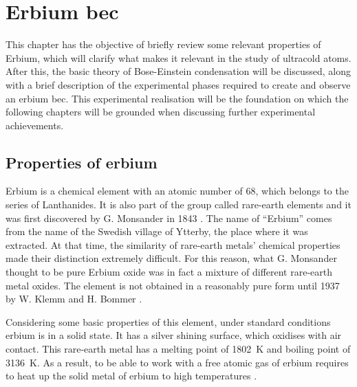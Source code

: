 
\chapter{Erbium \acl*{bec}}
\label{chap:erbium_bec}

This chapter has the objective of briefly review some relevant properties of Erbium, which will clarify what makes it relevant in the study of ultracold atoms. After this, the basic theory of Bose-Einstein condensation will be discussed, along with a brief description of the experimental phases required to create and observe an erbium \ac{bec}. This experimental realisation will be the foundation on which the following chapters will be grounded when discussing further experimental achievements.

\section{Properties of erbium} \label{sec:erbium_properties}
Erbium is a chemical element with an atomic number of 68, which belongs to the series of Lanthanides. It is also part of the group called rare-earth elements and it was first discovered by G. Monsander in 1843 \cite{mosander1843xxx}. The name of ``Erbium'' comes from the name of the Swedish village of Ytterby, the place where it was extracted. At that time, the similarity of rare-earth metals' chemical properties made their distinction extremely difficult. For this reason, what G. Monsander thought to be pure Erbium oxide was in fact a mixture of different rare-earth metal oxides. The element is not obtained in a reasonably pure form until 1937 by W. Klemm and H. Bommer \cite{klemm1937bommer}.

Considering some basic properties of this element, under standard conditions erbium is in a solid state. It has a silver shining surface, which oxidises with air contact. This rare-earth metal has a melting point of \SI{1802}{\kelvin} and boiling point of \SI{3136}{\kelvin}. As a result, to be able to work with a free atomic gas of erbium requires to heat up the solid metal of erbium to high temperatures \cite{emsley1998}.

